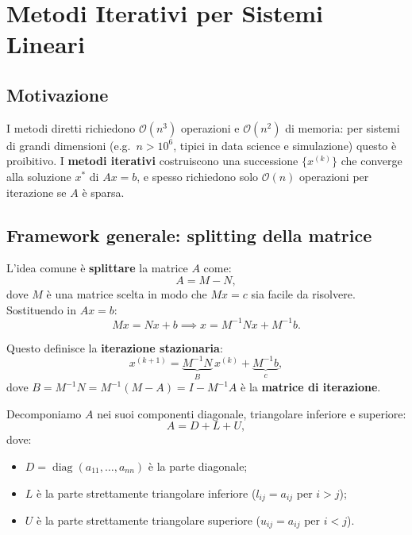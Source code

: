 \chapter{Metodi Iterativi per Sistemi Lineari}
\label{ch:iterativi}

\section{Motivazione}

I metodi diretti richiedono $\mathcal{O}(n^3)$ operazioni e $\mathcal{O}(n^2)$ di
memoria: per sistemi di grandi dimensioni (e.g.\ $n > 10^6$, tipici in data science e
simulazione) questo è proibitivo. I \textbf{metodi iterativi} costruiscono una
successione $\{x^{(k)}\}$ che converge alla soluzione $x^*$ di $Ax = b$, e spesso
richiedono solo $\mathcal{O}(n)$ operazioni per iterazione se $A$ è sparsa.

\section{Framework generale: splitting della matrice}
\label{sec:splitting}

L'idea comune è \textbf{splittare} la matrice $A$ come:
\begin{equation}
  A = M - N,
  \label{eq:splitting}
\end{equation}
dove $M$ è una matrice scelta in modo che $Mx = c$ sia facile da risolvere.
Sostituendo in $Ax = b$:
\begin{equation}
  Mx = Nx + b \implies x = M^{-1}Nx + M^{-1}b.
  \label{eq:iter_gen}
\end{equation}

Questo definisce la \textbf{iterazione stazionaria}:
\begin{equation}
  x^{(k+1)} = \underbrace{M^{-1}N}_{B}\, x^{(k)} + \underbrace{M^{-1}b}_{c},
  \label{eq:iter_staz}
\end{equation}
dove $B = M^{-1}N = M^{-1}(M - A) = I - M^{-1}A$ è la \textbf{matrice di iterazione}.

Decomponiamo $A$ nei suoi componenti diagonale, triangolare inferiore e superiore:
\begin{equation}
  A = D + L + U,
  \label{eq:DLU}
\end{equation}
dove:
\begin{itemize}
  \item $D = \operatorname{diag}(a_{11}, \ldots, a_{nn})$ è la parte diagonale;
  \item $L$ è la parte strettamente triangolare inferiore ($l_{ij} = a_{ij}$ per $i > j$);
  \item $U$ è la parte strettamente triangolare superiore ($u_{ij} = a_{ij}$ per $i < j$).
\end{itemize}

